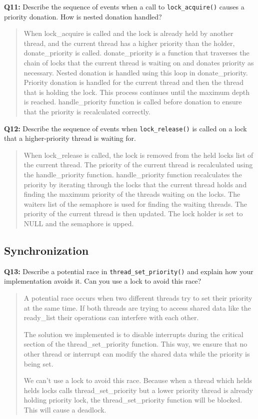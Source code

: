 \documentclass[a4paper,11pt]{paper}
\begin{document}
\textbf{Q11:} Describe the sequence of events when a call to \texttt{lock\_acquire()} causes a priority donation.  How is nested donation handled?
\begin{quote}
When lock\_acquire is called and the lock is already held by another thread, and the current thread has a higher priority than the holder, donate\_priority is called. donate\_priority is a function that traverses the chain of locks that the current thread is waiting on and donates priority as necessary. Nested donation is handled using this loop in donate\_priority. Priority donation is handled for the current thread and then the thread that is holding the lock. This process continues until the maximum depth is reached. handle\_priority function is called before donation to ensure
that the priority is recalculated correctly. 
\end{quote}

\textbf{Q12:} Describe the sequence of events when \texttt{lock\_release()} is called on a lock that a higher-priority thread is waiting for.
\begin{quote}
When lock\_release is called, the lock is removed from the held locks list of the current
thread. The priority of the current thread is recalculated using the handle\_priority function.
handle\_priority function recalculates the priority by iterating through the locks that the current
thread holds and finding the maximum priority of the threads waiting on the locks. The waiters list
of the semaphore is used for finding the waiting threads. The priority of the current thread is then
updated. The lock holder is set to NULL and the semaphore is upped. 
\end{quote}

\subsection{Synchronization}
 
\textbf{Q13:} Describe a potential race in \texttt{thread\_set\_priority()} and explain how your implementation avoids it. Can you use a lock to avoid this race?
\begin{quote}
A potential race occurs when two different threads try to set their priority at the same time.
If both threads are trying to access shared data like the ready\_list their operations can interfere
with each other. 

The solution we implemented is to disable interrupts during the critical
	section of the thread\_set\_priority function. This way, we ensure that no other
	thread or interrupt can modify the shared data while the priority is being
	set.

We can't use a lock to avoid this race. Because when a thread which helds helds locks calls 
thread\_set\_priority but a lower priority thread is already holding priority lock, the thread\_set\_priority function will be blocked. This will cause a deadlock.
\end{quote}
\end{document}
